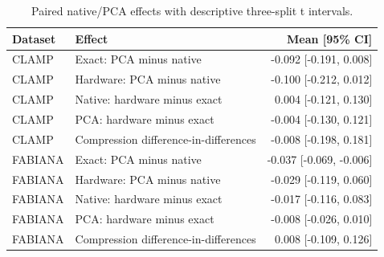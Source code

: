 \begin{table}[tbp]
\caption{Paired native/PCA effects with descriptive three-split t intervals.}
\label{tab:compression-effects}
\begin{tabular}{llr}
\toprule
Dataset & Effect & Mean [95\% CI] \\
\midrule
CLAMP & Exact: PCA minus native & -0.092 [-0.191, 0.008] \\
CLAMP & Hardware: PCA minus native & -0.100 [-0.212, 0.012] \\
CLAMP & Native: hardware minus exact & 0.004 [-0.121, 0.130] \\
CLAMP & PCA: hardware minus exact & -0.004 [-0.130, 0.121] \\
CLAMP & Compression difference-in-differences & -0.008 [-0.198, 0.181] \\
FABIANA & Exact: PCA minus native & -0.037 [-0.069, -0.006] \\
FABIANA & Hardware: PCA minus native & -0.029 [-0.119, 0.060] \\
FABIANA & Native: hardware minus exact & -0.017 [-0.116, 0.083] \\
FABIANA & PCA: hardware minus exact & -0.008 [-0.026, 0.010] \\
FABIANA & Compression difference-in-differences & 0.008 [-0.109, 0.126] \\
\bottomrule
\end{tabular}
\end{table}
